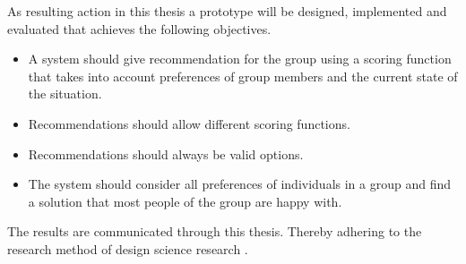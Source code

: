 As resulting action in this thesis a prototype will be designed, implemented and evaluated that achieves the following objectives.
\begin{itemize}
    \item A system should give recommendation for the group using a scoring function that takes into account preferences of group members and the current state of the situation.
    \item Recommendations should allow different scoring functions.
    \item Recommendations should always be valid options.
    \item The system should consider all preferences of individuals in a group and find a solution that most people of the group are happy with.
\end{itemize}
The results are communicated through this thesis. Thereby adhering to the research method of design science research \cite{peffersDesignScienceResearch2007}.